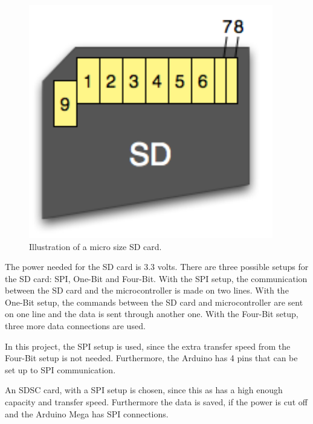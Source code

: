 \begin{minipage}{\linewidth}
\begin{minipage}{0.30\linewidth}
\begin{figure}[H]
              \includegraphics[width=0.95\textwidth]{figures/sdcardpinout}
              \caption{Illustration of a micro size SD card.\cite{elasticsheep}} 
              \label{SDcardpinout}
          \end{figure}
      \end{minipage}
      
  \end{minipage}


The power needed for the SD card is 3.3 volts\cite{elasticsheep}. There are three possible setups for the SD card: SPI, One-Bit and Four-Bit.
With the SPI setup, the communication between the SD card and the microcontroller is made on two lines. With the One-Bit setup, the commands between the SD card and microcontroller are sent on one line and the data is sent through another one.
With the Four-Bit setup, three more data connections are used.

In this project, the SPI setup is used, since the extra transfer speed from the Four-Bit setup is not needed. Furthermore, the Arduino has 4 pins that can be set up to SPI communication\cite{MegaInfo}.

An SDSC card, with a SPI setup is chosen, since this as has a high enough capacity and transfer speed. Furthermore the data is saved, if the power is cut off and the Arduino Mega has SPI connections. 



